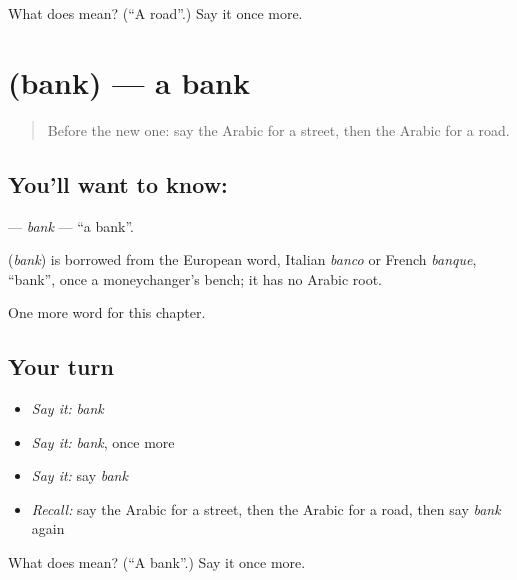 \begin{tcolorbox}[breakable,colback=teal!4,colframe=teal!35!black,title={Before you move on}]
What does  mean? (\textquotedblleft{}A road\textquotedblright{}.) Say it once more.
\end{tcolorbox}
\section[\texorpdfstring{\ar{بنك} (bank)}{بنك (bank)}]{ (bank) — a bank}

\label{lesson:AR-C91-bank}



\begin{quote}
Before the new one: say the Arabic for a street, then the Arabic for a road.
\end{quote}

\subsection*{You'll want to know: }
\textbf{} — \emph{bank} — \textquotedblleft{}a bank\textquotedblright{}.

\begin{cousinweb}
\textbf{} (\emph{bank}) is borrowed from the European word, Italian \emph{banco} or French \emph{banque}, \textquotedblleft{}bank\textquotedblright{}, once a moneychanger's bench; it has no Arabic root.
\end{cousinweb}

\begin{grammarlens}[title={What you've built}]
One more word for this chapter.
\end{grammarlens}

\subsection*{Your turn}
\begin{itemize}
\raggedright
  \item \emph{Say it:} \emph{bank}
  \item \emph{Say it:} \emph{bank}, once more
  \item \emph{Say it:} say \emph{bank}
  \item \emph{Recall:} say the Arabic for a street, then the Arabic for a road, then say \emph{bank} again
\end{itemize}

\begin{tcolorbox}[breakable,colback=teal!4,colframe=teal!35!black,title={Before you move on}]
What does  mean? (\textquotedblleft{}A bank\textquotedblright{}.) Say it once more.
\end{tcolorbox}
